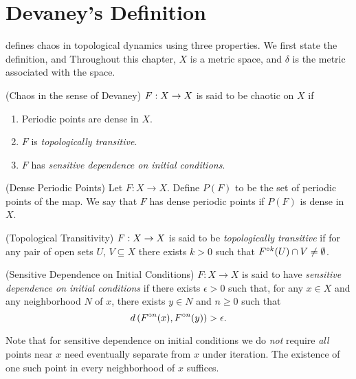 \documentclass[12pt,draft,twoside]{article}
\begin{document}
\chapter{Devaney's Definition}
\label{chap:devaney}
\citet{devaney} defines chaos in topological dynamics using three properties.
We first state the definition, and 
Throughout this chapter, $X$ is a metric space, and $\delta$ is the metric associated with the space.
\begin{definition}
  (Chaos in the sense of Devaney) 
  $F: X\rightarrow X$ is said to be chaotic on $X$ if
  \begin{enumerate}
    \item Periodic points are dense in $X$.
    \item $F$ is \textit{topologically transitive}.
    \item $F$ has \textit{sensitive dependence on initial conditions}.
  \end{enumerate}
\end{definition}
%
\begin{definition}
  (Dense Periodic Points) 
  Let $F: X \to X$.
  Define $P(F)$ to be the set of periodic points of the map.
  We say that $F$ has dense periodic points if $P(F)$ is dense in $X$.
\end{definition}
%
\begin{definition}
  (Topological Transitivity) 
  $F: X \rightarrow X$ is said to be \textit{topologically transitive} if for any pair of open sets $U$, $V \subseteq X$ there exists $k > 0$ such that $F^{\circ k}(U) \cap V \neq \emptyset$.
  \label{defn:transitivity}
\end{definition}
%
\begin{definition}
  (Sensitive Dependence on Initial Conditions) 
  $F: X \rightarrow X$ is said to have \textit{sensitive dependence on initial conditions} if there exists $\epsilon > 0$ such that, for any $x \in X$ and any neighborhood $N$ of $x$, there exists $y\in N$ and $n\geq 0$ such that 
  \begin{equation*}
    d\left( F^{\circ n}(x), F^{\circ n}(y) \right) > \epsilon.
  \end{equation*}
  \label{defn:sdic}
\end{definition}
%
\noindent Note that for sensitive dependence on initial conditions we do \textit{not} require \textit{all} points near $x$ need eventually separate from $x$ under iteration.
The existence of one such point in every neighborhood of $x$ suffices.
\end{document}
